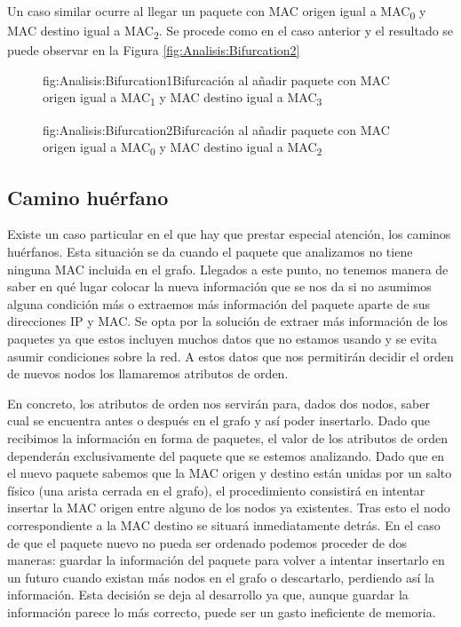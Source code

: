 \documentclass[tfg,epsbased,lof,lot,loa,covers,final,copyright,overleaf]{tfgtfmthesisuam}
\begin{document}
Un caso similar ocurre al llegar un paquete con MAC origen igual a MAC\textsubscript{0} y MAC destino igual a MAC\textsubscript{2}. Se procede como en el caso anterior y el resultado se puede observar en la Figura \ref{fig:Analisis:Bifurcation2}

\begin{figure}[Ejemplo de bifurcación 1]{fig:Analisis:Bifurcation1}{Bifurcación al añadir paquete con MAC origen igual a MAC\textsubscript{1} y MAC destino igual a MAC\textsubscript{3}}
    
\end{figure}

\begin{figure}[Ejemplo de bifurcación 2]{fig:Analisis:Bifurcation2}{Bifurcación al añadir paquete con MAC origen igual a MAC\textsubscript{0} y MAC destino igual a MAC\textsubscript{2}}
    
\end{figure}

\subsection{Camino huérfano}
\label{subsec:Analisis:Reconstruccion:Huerfano}
Existe un caso particular en el que hay que prestar especial atención, los caminos huérfanos. Esta situación se da cuando el paquete que analizamos no tiene ninguna MAC incluida en el grafo. Llegados a este punto, no tenemos manera de saber en qué lugar colocar la nueva información que se nos da si no asumimos alguna condición más o extraemos más información del paquete aparte de sus direcciones IP y MAC. Se opta por la solución de extraer más información de los paquetes ya que estos incluyen muchos datos que no estamos usando y se evita asumir condiciones sobre la red. A estos datos que nos permitirán decidir el orden de nuevos nodos los llamaremos atributos de orden.

En concreto, los atributos de orden nos servirán para, dados dos nodos, saber cual se encuentra antes o después en el grafo y así poder insertarlo. Dado que recibimos la información en forma de paquetes, el valor de los atributos de orden dependerán exclusivamente del paquete que se estemos analizando. Dado que en el nuevo paquete sabemos que la MAC origen y destino están unidas por un salto físico (una arista cerrada en el grafo), el procedimiento consistirá en intentar insertar la MAC origen entre alguno de los nodos ya existentes. Tras esto el nodo correspondiente a la MAC destino se situará inmediatamente detrás. En el caso de que el paquete nuevo no pueda ser ordenado podemos proceder de dos maneras: guardar la información del paquete para volver a intentar insertarlo en un futuro cuando existan más nodos en el grafo o descartarlo, perdiendo así la información. Esta decisión se deja al desarrollo ya que, aunque guardar la información parece lo más correcto, puede ser un gasto ineficiente de memoria.
\end{document}

